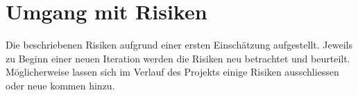\section{Umgang mit Risiken}
Die beschriebenen Risiken aufgrund einer ersten Einschätzung aufgestellt.
Jeweils zu Beginn einer neuen Iteration werden die Risiken neu betrachtet und beurteilt. Möglicherweise lassen sich im Verlauf des Projekts einige Risiken ausschliessen oder neue kommen hinzu.
